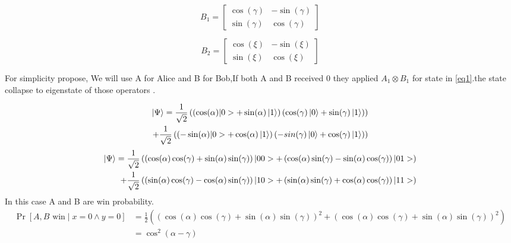  
 $$
 B_1= \begin{bmatrix}
 \cos(\gamma)  &  -\sin(\gamma) \\
 \sin(\gamma)  &  \cos(\gamma)
 \end{bmatrix}
 $$	

$$
B_2= \begin{bmatrix}
\cos(\xi)  &  -\sin(\xi) \\
\sin(\xi) &  \cos(\xi)
\end{bmatrix}
$$

For simplicity propose,  We will use A for Alice and B for Bob,If both A and B  received $0$ they applied $A_1\otimes B_1$ for  state in \ref{eq1}.the state collapse to eigenstate of those operators .



\begin{equation*}
\begin{aligned}
\ket{\Psi }= \frac{1}{\sqrt{2}}\left( \left(\cos(\alpha)|0>+\sin(\alpha)\ket{1} \right) \left(\cos(\gamma)\ket{0}+\sin(\gamma)\ket{1} \right) \right)  \\  
+  \frac{1}{\sqrt{2}} \left( \left(-\sin(\alpha)|0>+\cos(\alpha)\ket{1} \right) \left(-sin(\gamma)\ket{0}+\cos(\gamma)\ket{1} \right) \right)
\end{aligned}
\end{equation*}
\begin{equation*}
\begin{aligned}
\ket{\Psi} = \frac{1}{\sqrt{2}}\left(\left(\cos(\alpha) \cos(\gamma)+\sin(\alpha) \sin(\gamma)\right)|00>+\left( \cos(\alpha)  \sin(\gamma)-\sin(\alpha)  \cos(\gamma)\right)|01>\right)\\
+\frac{1}{\sqrt{2}}\left( \left( \sin(\alpha)  \cos(\gamma)-\cos(\alpha) \sin(\gamma)\right)|10>+\left(\sin(\alpha)  \sin(\gamma)+\cos(\alpha)  \cos(\gamma)\right)|11>\right)
\end{aligned}
\end{equation*}
In this case A and B are win probability.
\begin{align}
 \Pr[A,B \text{ win}  \mid  x=0 \wedge y=0]&=\frac{1}{2}\left(\left(\cos(\alpha) \cos(\gamma)+\sin(\alpha)\sin(\gamma)\right)^2   +\left(\cos(\alpha) \cos(\gamma)+\sin(\alpha)\sin(\gamma)\right)^2  \right)\nonumber\\ 
&=\cos^2(\alpha-\gamma)\label{eq2}
\end{align}

